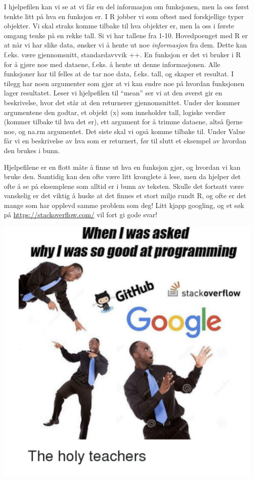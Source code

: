 \documentclass[
]{article}
\begin{document}
I hjelpefilen kan vi se at vi får en del informasjon om funksjonen, men
la oss først tenkte litt på hva en funksjon er. I R jobber vi som oftest
med forskjellige typer objekter. Vi skal straks komme tilbake til hva
objekter er, men la oss i første omgang tenke på en rekke tall. Si vi
har tallene fra 1-10. Hovedpoenget med R er at når vi har slike data,
ønsker vi å hente ut noe \emph{informasjon} fra dem. Dette kan f.eks.
være gjennomsnitt, standardavvvik ++. En funksjon er det vi bruker i R
for å gjøre noe med dataene, f.eks. å hente ut denne informasjonen. Alle
funksjoner har til felles at de tar noe data, f.eks. tall, og skaper et
resultat. I tilegg har noen argumenter som gjør at vi kan endre noe på
hvordan funksjonen lager resultatet. Leser vi hjelpefilen til ``mean''
ser vi at den øverst gir en beskrivelse, hvor det står at den returnerer
gjennomsnittet. Under der kommer argumentene den godtar, et objekt (x)
som inneholder tall, logiske verdier (kommer tilbake til hva det er),
ett argument for å trimme dataene, altså fjerne noe, og na.rm
argumentet. Det siste skal vi også komme tilbake til. Under Value får vi
en beskrivelse av hva som er returnert, før til slutt et eksempel av
hvordan den brukes i bunn.

Hjelpefilene er en flott måte å finne ut hva en funksjon gjør, og
hvordan vi kan bruke den. Samtidig kan den ofte være litt kronglete å
lese, men da hjelper det ofte å se på eksemplene som alltid er i bunn av
teksten. Skulle det fortsatt være vanskelig er det viktig å huske at det
finnes et stort miljø rundt R, og ofte er det mange som har opplevd
samme problem som deg! Litt kjapp googling, og et søk på
\url{https://stackoverflow.com/} vil fort gi gode svar!

\includegraphics{Bilder/Search.png}
\end{document}
